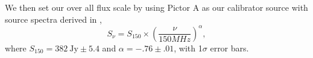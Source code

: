 \documentclass[twocolumn,numberedappendix]{emulateapj} \shorttitle{PSA64}
\begin{document}
%      
%
%

We then set our over all flux scale by using Pictor A as our calibrator source
with source spectra derived in \cite{jacobs_et_al2013}, 
\begin{equation}
    S_{\nu} = S_{150}\times\left(\frac{\nu}{150MHz}\right)^{\alpha},
\end{equation}
where $S_{150} = 382~\text{Jy} \pm 5.4$ and $\alpha = -.76 \pm .01$, with
1$\sigma$ error bars.


\end{document}
